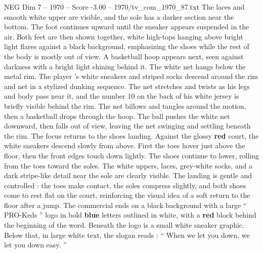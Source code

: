 \begin{textsample}{NEG Dim 7 – 1970 – Score -3.00 – 1970/tv\_com\_1970\_87.txt}
The laces and smooth white upper are visible, and the sole has a darker section near the bottom.
The foot continues upward until the sneaker appears suspended in the air.
Both feet are then shown together, white high-tops hanging above bright light flares against a black background, emphasizing the shoes while the rest of the body is mostly out of view.
A basketball hoop appears next, seen against darkness with a bright light shining behind it.
The white net hangs below the metal rim.
The player ’s white sneakers and striped socks descend around the rim and net in a stylized dunking sequence.
The net stretches and twists as his legs and body pass near it, and the number 10 on the back of his white jersey is briefly visible behind the rim.
The net billows and tangles around the motion, then a basketball drops through the hoop.
The ball pushes the white net downward, then falls out of view, leaving the net swinging and settling beneath the rim.
The focus returns to the shoes landing.
Against the glossy \textbf{red} court, the white sneakers descend slowly from above.
First the toes hover just above the floor, then the front edges touch down lightly.
The shoes continue to lower, rolling from the toes toward the soles.
The white uppers, laces, grey-white socks, and a dark stripe-like detail near the sole are clearly visible.
The landing is gentle and controlled : the toes make contact, the soles compress slightly, and both shoes come to rest flat on the court, reinforcing the visual idea of a soft return to the floor after a jump.
The commercial ends on a black background with a large “ PRO-Keds ” logo in bold \textbf{blue} letters outlined in white, with a \textbf{red} block behind the beginning of the word.
Beneath the logo is a small white sneaker graphic.
Below that, in large white text, the slogan reads : “ When we let you down, we let you down easy. ”

\end{textsample}
